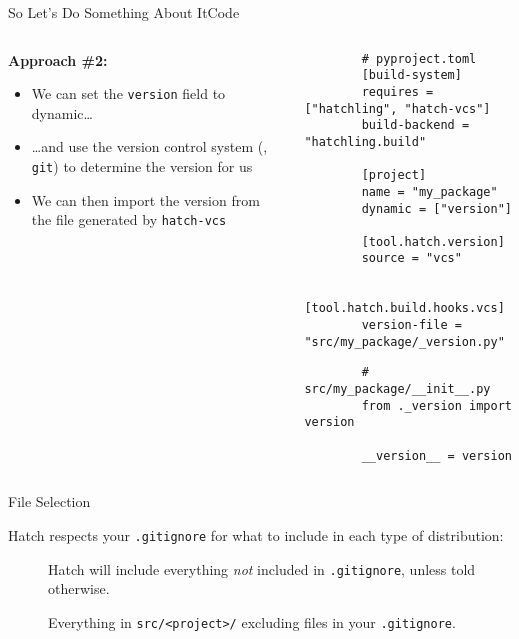 \begin{splitframe}[fragile]{So Let's Do Something About It}{Code}
  \begin{columns}[t,onlytextwidth]
    {
    \begin{column}{0.58\textwidth}
      \textbf{\textcolor{ccyan}{Approach \#2:}}
      \begin{itemize}
        \setlength{\itemsep}{1em}
        \item We can set the \texttt{version} field to dynamic\dots
        \item \dots and use the version control system (\eg, \texttt{git})
          to determine the version for us
        \item We can then import the version from the file generated by \texttt{hatch-vcs}
      \end{itemize}
    \end{column}
    }
    \begin{column}{0.38\textwidth}
      \small
      \begin{verbatim}
        # pyproject.toml
        [build-system]
        requires = ["hatchling", "hatch-vcs"]
        build-backend = "hatchling.build"

        [project]
        name = "my_package"
        dynamic = ["version"]

        [tool.hatch.version]
        source = "vcs"

        [tool.hatch.build.hooks.vcs]
        version-file = "src/my_package/_version.py"
      \end{verbatim}
      \vspace{1em}
      \begin{verbatim}
        # src/my_package/__init__.py
        from ._version import version

        __version__ = version
      \end{verbatim}
    \end{column}
  \end{columns}
\end{splitframe}

\begin{frame}{File Selection}
  \begin{center}
    \Large\textcolor{ccyan}{Hatch respects your \texttt{.gitignore} for what to include in each type
    of distribution:}
  \end{center}
  \begin{description}
    \item []
      Hatch will include everything \emph{not} included in \texttt{.gitignore}, unless told otherwise.
    \item [] Everything in \texttt{src/<project>/} excluding files in
    your \texttt{.gitignore}.
  \end{description}
\end{frame}

